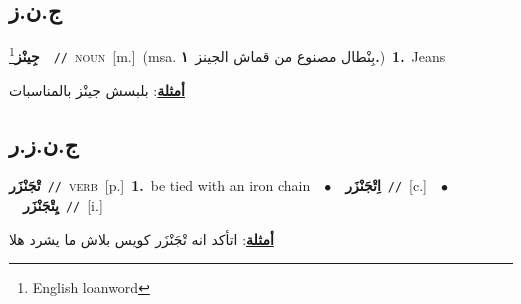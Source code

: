 \documentclass[10pt,a4paper,twoside]{article} %
\begin{document}
\begin{multicols}{2}
\vspace{-3mm}
\subsection*{\color{blue}\foreignlanguage{arabic}{ج.ن.ز}\color{blue}{ (ntws)}} 

{\setlength\topsep{0pt}\textbf{\foreignlanguage{arabic}{جِينْز}}\footnote{English loanword}\ \ {\color{gray}\texttt{//}\color{black}}\ \textsc{noun}\ [m.]\ \color{gray}(msa. \foreignlanguage{arabic}{بِنْطال مصنوع من قماش الجينز}~\foreignlanguage{arabic}{\textbf{١.}})\color{black}\ \textbf{1.}~Jeans\  \begin{flushright}\color{gray}\foreignlanguage{arabic}{\textbf{\underline{\foreignlanguage{arabic}{أمثلة}}}: بلبسش جينْز بالمناسبات}\end{flushright}\color{black}} \vspace{2mm}

\vspace{-3mm}
\subsection*{\color{blue}\foreignlanguage{arabic}{ج.ن.ز.ر}\color{blue}{}} 

{\setlength\topsep{0pt}\textbf{\foreignlanguage{arabic}{تْجَنْزَر}}\ {\color{gray}\texttt{//}\color{black}}\ \textsc{verb}\ [p.]\ \textbf{1.}~be tied with an iron chain\ \ $\bullet$\ \ \setlength\topsep{0pt}\textbf{\foreignlanguage{arabic}{اِتْجَنْزَر}}\ {\color{gray}\texttt{//}\color{black}}\ [c.]\ \ $\bullet$\ \ \setlength\topsep{0pt}\textbf{\foreignlanguage{arabic}{يِتْجَنْزَر}}\ {\color{gray}\texttt{//}\color{black}}\ [i.]\  \begin{flushright}\color{gray}\foreignlanguage{arabic}{\textbf{\underline{\foreignlanguage{arabic}{أمثلة}}}: اتأكد انه تْجَنْزَر كويس بلاش ما يشرد هلا}\end{flushright}\color{black}} \vspace{2mm}


\end{multicols}
\end{document}
